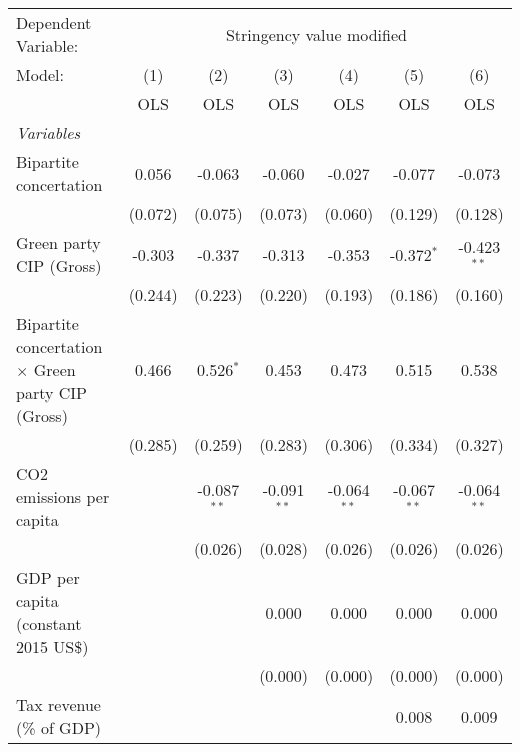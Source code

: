 
\begingroup
\centering
\begin{tabular}{lcccccc}
   \toprule
   Dependent Variable: & \multicolumn{6}{c}{Stringency value modified}\\
   Model:                                                   & (1)     & (2)           & (3)           & (4)           & (5)           & (6)\\  
                                                            &  OLS    & OLS           & OLS           & OLS           & OLS           & OLS\\  
   \midrule
   \emph{Variables}\\
   Bipartite concertation                                   & 0.056   & -0.063        & -0.060        & -0.027        & -0.077        & -0.073\\   
                                                            & (0.072) & (0.075)       & (0.073)       & (0.060)       & (0.129)       & (0.128)\\   
   Green party CIP (Gross)                                  & -0.303  & -0.337        & -0.313        & -0.353        & -0.372$^{*}$  & -0.423$^{**}$\\   
                                                            & (0.244) & (0.223)       & (0.220)       & (0.193)       & (0.186)       & (0.160)\\   
   Bipartite concertation $\times$ Green party CIP (Gross)  & 0.466   & 0.526$^{*}$   & 0.453         & 0.473         & 0.515         & 0.538\\   
                                                            & (0.285) & (0.259)       & (0.283)       & (0.306)       & (0.334)       & (0.327)\\   
   CO2 emissions per capita                                 &         & -0.087$^{**}$ & -0.091$^{**}$ & -0.064$^{**}$ & -0.067$^{**}$ & -0.064$^{**}$\\   
                                                            &         & (0.026)       & (0.028)       & (0.026)       & (0.026)       & (0.026)\\   
   GDP per capita (constant 2015 US\$)                      &         &               & 0.000         & 0.000         & 0.000         & 0.000\\   
                                                            &         &               & (0.000)       & (0.000)       & (0.000)       & (0.000)\\   
   Tax revenue (\% of GDP)                                  &         &               &               &               & 0.008         & 0.009\\   

\end{tabular}
